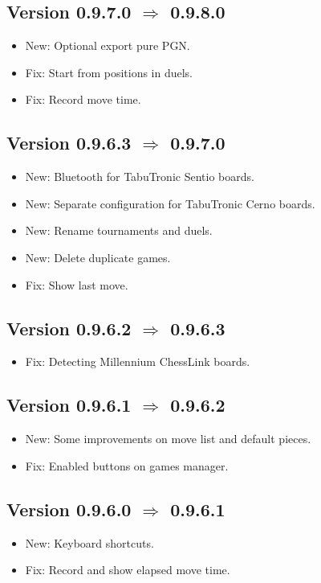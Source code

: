 \documentclass[11pt,a4paper]{article}
\begin{document}
\subsection*{Version 0.9.7.0 $\Rightarrow$  0.9.8.0}
\begin{itemize}
	\item {\color{blue}New}: Optional export pure PGN.
	\item {\color{red}Fix}: Start from positions in duels.
	\item {\color{red}Fix}: Record move time.
\end{itemize}


\subsection*{Version 0.9.6.3 $\Rightarrow$  0.9.7.0}
\begin{itemize}
	\item {\color{blue}New}: Bluetooth for TabuTronic Sentio boards.
	\item {\color{blue}New}: Separate configuration for TabuTronic Cerno boards.
	\item {\color{blue}New}: Rename tournaments and duels.
	\item {\color{blue}New}: Delete duplicate games.
    \item {\color{red}Fix}: Show last move.
\end{itemize}


\subsection*{Version 0.9.6.2 $\Rightarrow$  0.9.6.3}
\begin{itemize}
	\item {\color{red}Fix}: Detecting Millennium ChessLink boards.
\end{itemize}


\subsection*{Version 0.9.6.1 $\Rightarrow$  0.9.6.2}
\begin{itemize}
	\item {\color{blue}New}: Some improvements on move list and default pieces.
	\item {\color{red}Fix}: Enabled buttons on games manager.
\end{itemize}

\subsection*{Version 0.9.6.0 $\Rightarrow$  0.9.6.1}
\begin{itemize}
	\item {\color{blue}New}: Keyboard shortcuts.
	\item {\color{red}Fix}: Record and show elapsed move time.		
\end{itemize}
\end{document}
